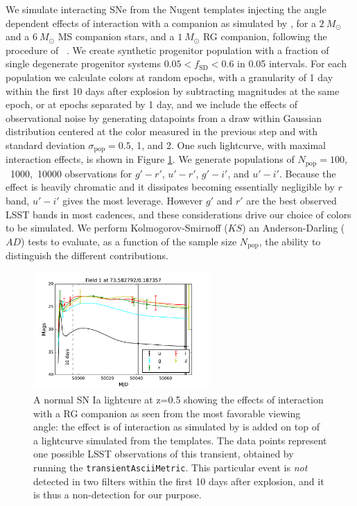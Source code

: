We simulate interacting SNe from the Nugent templates \citep{Nugent02}
injecting the angle dependent effects of interaction with a companion
as simulated by \citep{Kasen10}, for a $2~M_\odot$ and a $6~M_\odot$
MS companion stars, and a $1~M_\odot$ RG companion, following the
procedure of ~\citep{Bianco11}. We create synthetic progenitor
population with a fraction of single degenerate progenitor systems
$0.05 < f_\mathrm{SD} < 0.6 $ in 0.05 intervals. For each population
we calculate colors at random epochs, with a granularity of 1 day
within the first 10 days after explosion by subtracting magnitudes at
the same epoch, or at epochs separated by 1 day, and we include the
effects of observational noise by generating datapoints from a draw
within Gaussian distribution centered at the color measured in the
previous step and with standard deviation $\sigma_\mathrm{pop} = 0.5$,
1, and 2. One such lightcurve, with maximal interaction effects, is shown in Figure \ref{fig:kasenlc}.
We generate populations of $N_\mathrm{pop}=100$,
~1000,~10000 observations for $g'-r'$, $u'-r'$, $g'-i'$, and
$u'-i'$. Because the effect is heavily chromatic and it dissipates
becoming essentially negligible by $r$ band, $u'-i'$ gives the most
leverage. However $g'$ and $r'$ are the best observed LSST bands in
most cadences, and these considerations drive our choice of colors to
be simulated. We perform Kolmogorov-Smirnoff ($KS$) an
Anderson-Darling ($AD$) tests to evaluate, as a function of the sample
size $N_\mathrm{pop}$, the ability to distinguish the different
contributions.

\begin{figure}[hbt]
\centerline{
\includegraphics[width=0.6\textwidth]{figs/transients/LSST_Kasen_lcv0.pdf}
}
\caption{
A normal SN Ia lightcure at z=0.5 showing the effects of interaction with a RG companion as seen from the most favorable viewing angle: the effect is of interaction as simulated by \citet{Kasen10} is added on top of a lightcurve simulated from the \citealt{Nugent02} templates. The data points represent one possible LSST observations of this transient, obtained by running the \texttt{transientAsciiMetric}. This particular event is \emph{not} detected in two filters within the first 10 days after explosion, and it is thus a non-detection for our purpose.}
\label{fig:kasenlc}
\end{figure}



